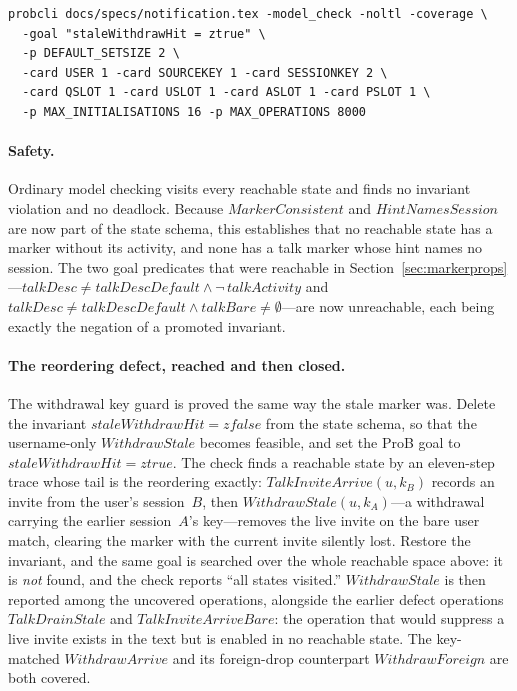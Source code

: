 \documentclass[a4paper,10pt,fleqn]{article}
\begin{document}
\begin{verbatim}
probcli docs/specs/notification.tex -model_check -noltl -coverage \
  -goal "staleWithdrawHit = ztrue" \
  -p DEFAULT_SETSIZE 2 \
  -card USER 1 -card SOURCEKEY 1 -card SESSIONKEY 2 \
  -card QSLOT 1 -card USLOT 1 -card ASLOT 1 -card PSLOT 1 \
  -p MAX_INITIALISATIONS 16 -p MAX_OPERATIONS 8000
\end{verbatim}

\paragraph{Safety.}  Ordinary model checking visits every reachable state
and finds no invariant violation and no deadlock.  Because
$MarkerConsistent$ and $HintNamesSession$ are now part of the state
schema, this establishes that no reachable state has a marker without its
activity, and none has a talk marker whose hint names no session.  The
two goal predicates that were reachable in
Section~\ref{sec:markerprops}---$talkDesc \neq talkDescDefault \land
\lnot\, talkActivity$ and $talkDesc \neq talkDescDefault \land talkBare
\neq \emptyset$---are now unreachable, each being exactly the negation of a
promoted invariant.

\paragraph{The reordering defect, reached and then closed.}  The withdrawal
key guard is proved the same way the stale marker was.  Delete the invariant
$staleWithdrawHit = zfalse$ from the state schema, so that the username-only
$WithdrawStale$ becomes feasible, and set the ProB goal to
$staleWithdrawHit = ztrue$.  The check finds a reachable state by an
eleven-step trace whose tail is the reordering exactly:
$TalkInviteArrive(u, k_B)$ records an invite from the user's session~$B$,
then $WithdrawStale(u, k_A)$---a withdrawal carrying the earlier session~$A$'s
key---removes the live invite on the bare user match, clearing the marker with
the current invite silently lost.  Restore the invariant, and the same goal is
searched over the whole reachable space above: it is \emph{not} found, and the
check reports ``all states visited.''  $WithdrawStale$ is then reported among
the uncovered operations, alongside the earlier defect operations
$TalkDrainStale$ and $TalkInviteArriveBare$: the operation that would suppress
a live invite exists in the text but is enabled in no reachable state.  The
key-matched $WithdrawArrive$ and its foreign-drop counterpart $WithdrawForeign$
are both covered.
\end{document}
